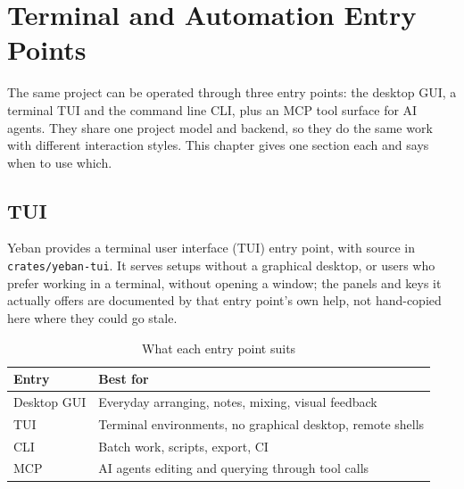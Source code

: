 
\chapter{Terminal and Automation Entry Points}
\label{ch:entry-points}






The same project can be operated through three entry points: the desktop GUI, a
terminal TUI and the command line CLI, plus an MCP tool surface for AI agents. They
share one project model and backend, so they do the same work with different
interaction styles. This chapter gives one section each and says when to use which.

\section{TUI}

Yeban provides a terminal user interface (TUI) entry point, with source in
\texttt{crates/yeban-tui}. It serves setups without a graphical desktop, or users who
prefer working in a terminal, without opening a window; the panels and keys it actually
offers are documented by that entry point's own help, not hand-copied here where they
could go stale.

\begin{table}[htbp]
\centering
\caption{What each entry point suits}
\label{tab:ch10-entry-compare}
\begin{tabular}{ll}
\hline
Entry & Best for \\
\hline
Desktop GUI & Everyday arranging, notes, mixing, visual feedback \\
TUI & Terminal environments, no graphical desktop, remote shells \\
CLI & Batch work, scripts, export, CI \\
MCP & AI agents editing and querying through tool calls \\
\hline
\end{tabular}
\end{table}

